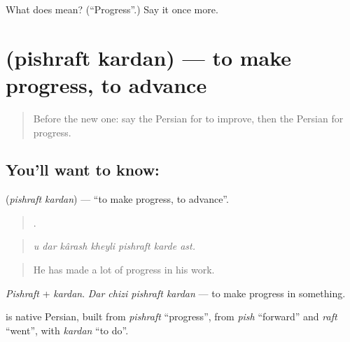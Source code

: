 \begin{tcolorbox}[breakable,colback=teal!4,colframe=teal!35!black,title={Before you move on}]
What does  mean? (\textquotedblleft{}Progress\textquotedblright{}.) Say it once more.
\end{tcolorbox}
\section[\texorpdfstring{\fa{پیشرفت} \fa{کردن} (pishraft kardan)}{پیشرفت کردن (pishraft kardan)}]{  (pishraft kardan) — to make progress, to advance}

\label{lesson:FA-C374-pishraft-kardan}



\begin{quote}
Before the new one: say the Persian for to improve, then the Persian for progress.
\end{quote}

\subsection*{You'll want to know:  }
\textbf{ } (\emph{pishraft kardan}) — \textquotedblleft{}to make progress, to advance\textquotedblright{}.

\begin{quote}
      .
\end{quote}

\begin{quote}
\emph{u dar kârash kheyli pishraft karde ast.}
\end{quote}

\begin{quote}
He has made a lot of progress in his work.
\end{quote}

\emph{Pishraft} + \emph{kardan}. \emph{Dar chizi pishraft kardan} — to make progress in something.

\begin{cousinweb}
\textbf{ } is native Persian, built from \emph{pishraft} \textquotedblleft{}progress\textquotedblright{}, from \emph{pish} \textquotedblleft{}forward\textquotedblright{} and \emph{raft} \textquotedblleft{}went\textquotedblright{}, with \emph{kardan} \textquotedblleft{}to do\textquotedblright{}.
\end{cousinweb}


